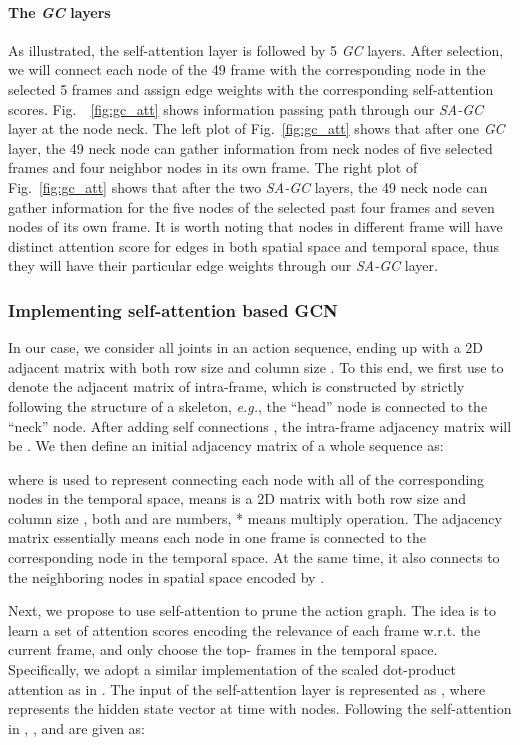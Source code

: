 \documentclass[runningheads]{llncs}
\begin{document}
\paragraph{The {\it GC} layers}
As illustrated, the self-attention layer is followed by 5 {\it GC} layers. 
After selection, we will connect each node of the 49 frame with the corresponding node in the selected 5 frames and assign edge weights with the corresponding self-attention scores. Fig.~~\ref{fig:gc_att} shows information passing path through our {\it SA-GC} layer at the node neck. The left plot of Fig.~\ref{fig:gc_att} shows that after one {\it GC} layer, the 49 neck node can gather information from neck nodes of five selected frames and four neighbor nodes in its own frame. The right plot of Fig.~\ref{fig:gc_att} shows that after the two {\it SA-GC} layers, the 49 neck node can gather information for the five nodes of the selected past four frames and seven nodes of its own frame. 
It is worth noting that nodes in different frame will have distinct attention score for edges in both spatial space and temporal space, thus they will have their particular edge weights through our {\it SA-GC} layer. 

\subsubsection{Implementing self-attention based GCN}
In our case, we consider all joints in an action sequence, ending up with a 2D adjacent matrix with both row size and column size . 
To this end, we first use  to denote the adjacent matrix of intra-frame, which is constructed by strictly following the structure of a skeleton, {\it e.g.}, the ``head'' node is connected to the ``neck'' node. 
After adding self connections , the intra-frame adjacency matrix will be .
We then define an initial adjacency matrix of a whole sequence as: 



where  is used to represent connecting each node with all of the corresponding nodes in the temporal space,  means  is a 2D matrix with both row size and column size , both  and  are numbers, * means multiply operation. The adjacency matrix  essentially means each node in one frame is connected to the corresponding node in the temporal space. 
At the same time, it also connects to the neighboring nodes in spatial space encoded by .  

Next, we propose to use self-attention to prune the action graph. The idea is to learn a set of attention scores encoding the relevance of each frame w.r.t.\! the current frame, and only choose the top- frames in the temporal space. Specifically, we adopt a similar implementation of the scaled dot-product attention as in \cite{vaswani2017attention}. The input of the self-attention layer is represented as , where  represents the hidden state vector at time  with  nodes.
Following the self-attention in \cite{vaswani2017attention}, ,  and  are given as:
\end{document}
